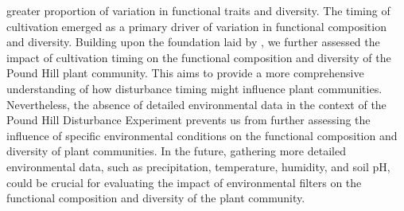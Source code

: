 \documentclass[a4paper, 11, margin=2cm]{article}
\begin{document}
greater proportion of variation in functional traits and diversity. The timing of cultivation emerged as a primary driver of variation in functional composition and diversity. Building upon the foundation laid by \citet{crawley2004timing,crawley2021rise}, we further assessed the impact of cultivation timing on the functional composition and diversity of the Pound Hill plant community. This aims to provide a more comprehensive understanding of how disturbance timing might influence plant communities. Nevertheless, the absence of detailed environmental data in the context of the Pound Hill Disturbance Experiment prevents us from further assessing the influence of specific environmental conditions on the functional composition and diversity of plant communities. In the future, gathering more detailed environmental data, such as precipitation, temperature, humidity, and soil pH, could be crucial for evaluating the impact of environmental filters on the functional composition and diversity of the plant community.
\end{document}
